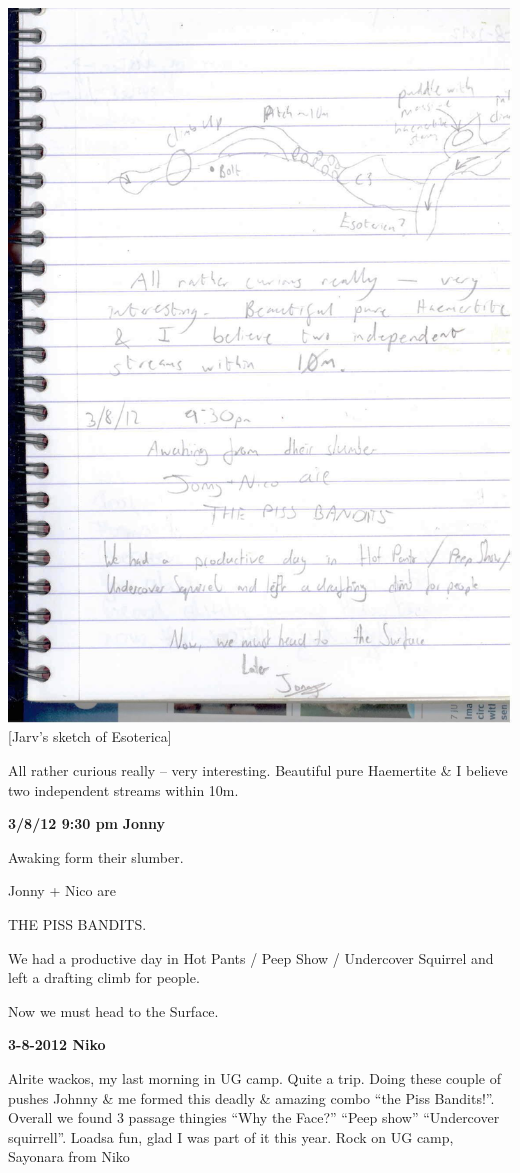 \includegraphics{UgLog1012/83.jpeg}\\
{[}Jarv's sketch of Esoterica{]}

All rather curious really -- very interesting. Beautiful pure Haemertite
\& I believe two independent streams within 10m.

\textbf{3/8/12 9:30 pm} \textbf{Jonny}

Awaking form their slumber.

Jonny + Nico are

THE PISS BANDITS.

We had a productive day in Hot Pants / Peep Show / Undercover Squirrel
and left a drafting climb for people.

Now we must head to the Surface.

\textbf{3-8-2012 Niko}

Alrite wackos, my last morning in UG camp. Quite a trip. Doing these
couple of pushes Johnny \& me formed this deadly \& amazing combo ``the
Piss Bandits!''. Overall we found 3 passage thingies ``Why the Face?''
``Peep show'' ``Undercover squirrell''. Loadsa fun, glad I was part of
it this year. Rock on UG camp, Sayonara from Niko

